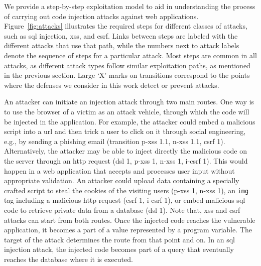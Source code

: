 \documentclass[10pt,journal,compsoc]{IEEEtran}
\begin{document}
We provide a step-by-step exploitation model to aid in understanding the process
of carrying out code injection attacks against web
applications. Figure~\ref{fig:attacks} illustrates the required steps for
different classes of attacks,
such as {\sc sql} injection, {\sc xss}, and {\sc csrf}. Links between steps are
labeled with the different attacks that use that path, while the
numbers next to attack labels denote the sequence of steps for a
particular attack. Most steps are common in all attacks, as different attack
types follow similar exploitation paths, as mentioned in
the previous section. Large `X' marks on transitions correspond to the
points where the defenses we consider in this work detect or prevent attacks.

An attacker can initiate an injection attack through two main routes.
One way is to use the browser of a victim as an attack
vehicle, through which the code will be injected in the application.
For example, the attacker could embed a malicious script into a {\sc
  url} and then trick a user to click on it through social
engineering, e.g., by sending a phishing email (transition {\sc p-xss} 1.1, {\sc
  n-xss} 1.1, {\sc csrf} 1). Alternatively, the attacker may be able
to inject directly the malicious code on the server through an {\sc http} request
({\sc dsl} 1, {\sc p-xss} 1, {\sc n-xss} 1, {\sc i-csrf} 1). This would happen
in a web application that accepts and processes user input
without appropriate validation. An attacker could upload data
containing a specially crafted script
to steal the cookies of the visiting users ({\sc p-xss} 1, {\sc n-xss} 1),
an {\tt img} tag including a malicious {\sc http} request ({\sc csrf 1}, {\sc
i-csrf 1}),
or embed malicious
{\sc sql} code to retrieve private data from a database ({\sc dsl} 1).
Note that, {\sc xss} and {\sc csrf} attacks can start from both routes.
Once the injected code reaches the vulnerable application, it becomes
a part of a value represented by a program variable. The target of the
attack determines the route from that point and on. In an {\sc sql} injection
attack, the injected code becomes part of a query that
eventually reaches the database where it is executed.
\end{document}
